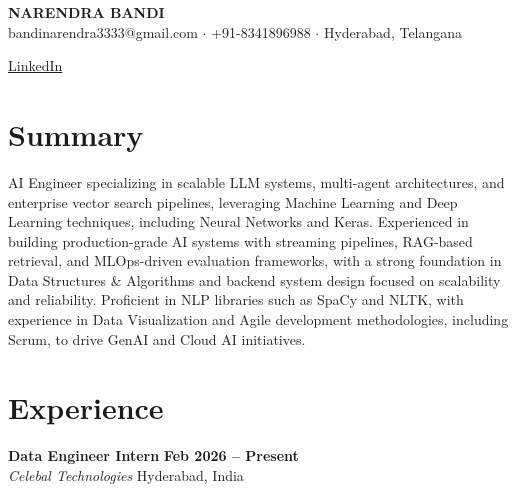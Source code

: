 \documentclass[11pt,a4paper]{article}
\begin{document}
\begin{center}
    {\Huge \textbf{\color{brand}NARENDRA BANDI}} \\[2mm]
    

bandinarendra3333@gmail.com $\cdot$ +91-8341896988 $\cdot$ Hyderabad, Telangana    
    \vspace{1mm}
    
\href{https://LinkedIn}{LinkedIn}\end{center}

\section*{Summary}
AI Engineer specializing in scalable LLM systems, multi-agent architectures, and enterprise vector search pipelines, leveraging Machine Learning and Deep Learning techniques, including Neural Networks and Keras. Experienced in building production-grade AI systems with streaming pipelines, RAG-based retrieval, and MLOps-driven evaluation frameworks, with a strong foundation in Data Structures \& Algorithms and backend system design focused on scalability and reliability. Proficient in NLP libraries such as SpaCy and NLTK, with experience in Data Visualization and Agile development methodologies, including Scrum, to drive GenAI and Cloud AI initiatives.

\section*{Experience}
    \vspace{2mm}
    \noindent
    \textbf{ Data Engineer Intern } \hfill {\color{brand}\textbf{ Feb 2026 -- Present }} \\
    \textit{ Celebal Technologies } \hfill Hyderabad, India    
    
\end{document}
